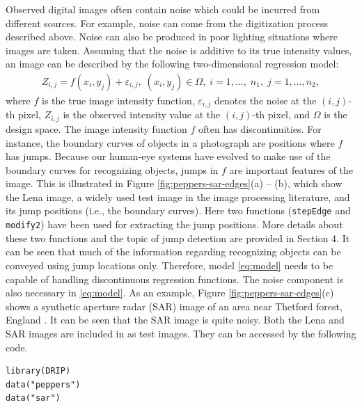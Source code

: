 Observed digital images often contain noise which could be incurred from different sources. For example, noise can come from the digitization process described above. Noise can also be produced in poor lighting situations where images are taken. Assuming that the noise is additive to its true intensity values, an image can be described by the following two-dimensional regression model:
\begin{align}
  \label{eq:model}
  Z_{i, j} = f(x_i, y_j) + \varepsilon_{i, j}, \; (x_i, y_j) \in \Omega, \; i = 1, \ldots, \; n_1, \; j = 1, \ldots, n_2,
\end{align}
where \(f\) is the true image intensity function, \(\varepsilon_{i, j}\) denotes the noise at the \((i, j)\)-th pixel, \(Z_{i,j}\) is the observed intensity value at the \((i, j)\)-th pixel, and \(\Omega\) is the design space. The image intensity function \(f\) often has discontinuities. For instance, the boundary curves of objects in a photograph are positions where \(f\) has jumps. Because our human-eye systems have evolved to make use of the boundary curves for recognizing objects, jumps in \(f\) are important features of the image. This is illustrated in Figure \ref{fig:peppers-sar-edges}(a) -- (b), which show the Lena image, a widely used test image in the image processing literature, and its jump positions (i.e., the boundary curves). Here two functions (\texttt{stepEdge} and \texttt{modify2}) have been used for extracting the jump positions. More details about these two functions and the topic of jump detection are provided in Section 4. It can be seen that much of the information regarding recognizing objects can be conveyed using jump locations only. Therefore, model \eqref{eq:model} needs to be capable of handling discontinuous regression functions. The noise component is also necessary in \eqref{eq:model}. As an example, Figure \ref{fig:peppers-sar-edges}(c) shows a synthetic aperture radar (SAR) image of an area near Thetford forest, England \citep{glasbey1995image}. It can be seen that the SAR image is quite noisy. Both the Lena and SAR images are included in  as test images. They can be accessed by the following code.

\begin{verbatim}
library(DRIP)
data("peppers")
data("sar")
\end{verbatim}

